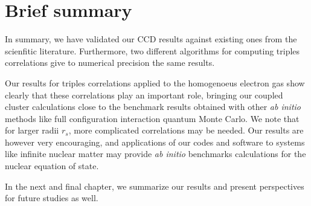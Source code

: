 \section{Brief summary}
In summary, we have validated our CCD results against existing ones
from the scienfitic literature. Furthermore, two different algorithms
for computing triples correlations give to numerical precision the
same results.

Our results for triples correlations applied to the homogenoeus
electron gas show clearly that these correlations play an important
role, bringing our coupled cluster calculations close to the benchmark
results obtained with other {\em ab initio} methods like full
configuration interaction quantum Monte Carlo. We note that for larger
radii $r_s$, more complicated correlations may be needed. Our results
are however very encouraging, and applications of our codes and
software to systems like infinite nuclear matter may provide {\em ab initio} benchmarks calculations for the nuclear equation of state.

In the next and final chapter, we summarize our results and present perspectives for future studies as well.
